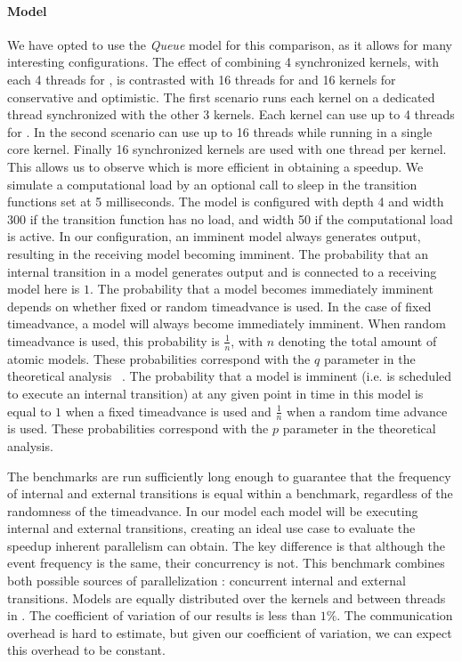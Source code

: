 \paragraph{Model}
We have opted to use the \textit{Queue} model for this comparison, as it allows for many interesting configurations.
The effect of combining 4 synchronized kernels, with each 4 threads for \pSim, is contrasted with 16 threads for \pSim and 16 kernels for conservative and optimistic.
The first scenario runs each kernel on a dedicated thread synchronized with the other 3 kernels. Each kernel can use up to 4 threads for \pSim. In the second scenario \pSim can use up to 16 threads while running in a single core kernel. Finally 16 synchronized kernels are used with one thread per kernel.
This allows us to observe which is more efficient in obtaining a speedup.
We simulate a computational load by an optional call to sleep in the transition functions set at 5 milliseconds.
The model is configured with depth 4 and width 300 if the transition function has no load, and width 50 if the computational load is active.
In our configuration, an imminent model always generates output, resulting in the receiving model becoming imminent.
The probability that an internal transition in a model generates output and is connected to a receiving model here is $1$. The probability that a model becomes immediately imminent depends on whether fixed or random timeadvance is used. In the case of fixed timeadvance, a model will always become immediately imminent. When random timeadvance is used, this probability is $\frac{1}{n}$, with $n$ denoting the total amount of atomic models. These probabilities correspond with the $q$ parameter in the theoretical analysis ~\cite{amdahlpdevs}. 
The probability that a model is imminent (i.e. is scheduled to execute an internal transition) at any given point in time in this model is equal to $1$ when a fixed timeadvance is used and $\frac{1}{n}$ when a random time advance is used. These probabilities correspond with the $p$ parameter in the theoretical analysis.

The benchmarks are run sufficiently long enough to guarantee that the frequency of internal and external transitions is equal within a benchmark, regardless of the randomness of the timeadvance. In our model each model will be executing internal and external transitions, creating an ideal use case to evaluate the speedup inherent parallelism can obtain. 
The key difference is that although the event frequency is the same, their concurrency is not. 
This benchmark combines both possible sources of parallelization : concurrent internal and external transitions. 
Models are equally distributed over the kernels and between threads in \pSim.
The coefficient of variation of our results is less than $1\%$.
The communication overhead is hard to estimate, but given our coefficient of variation, we can expect this overhead to be constant.

